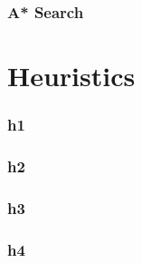 \documentclass[14pt,a4paper]{report}
\begin{document}
\section{A* Search}

\part{Heuristics}
\section{h1}
\section{h2}
\section{h3}
\section{h4}
\end{document}
